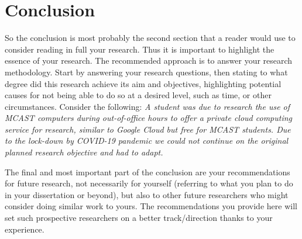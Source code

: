 \section{Conclusion}
\label{sec:Con}
So the conclusion is most probably the second section that a reader would use to consider reading in full your research. Thus it is important to highlight the essence of your research. The recommended approach is to answer your research methodology. Start by answering your research questions, then stating to what degree did this research achieve its aim and objectives, highlighting potential causes for not being able to do so at a desired level, such as time, or other circumstances. Consider the following: \textit{A student was due to research the use of MCAST computers during out-of-office hours to offer a private cloud computing service for research, similar to Google Cloud but free for MCAST students. Due to the lock-down by COVID-19 pandemic we could not continue on the original planned research objective and had to adapt.}
\par The final and most important part of the conclusion are your recommendations for future research, not necessarily for yourself (referring to what you plan to do in your dissertation or beyond), but also to other future researchers who might consider doing similar work to yours. The recommendations you provide here will set such prospective researchers on a better track/direction thanks to your experience.